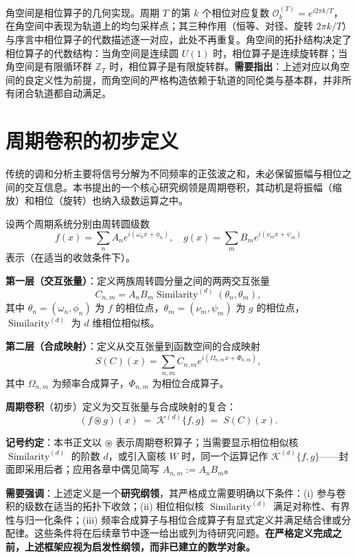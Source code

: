 角空间是相位算子的几何实现。周期 $T$ 的第 $k$ 个相位对应复数 $\mathcal{O}_k^{(T)} = e^{i2\pi k/T}$，在角空间中表现为轨道上的均匀采样点；其三种作用（恒等、对径、旋转 $2\pi k/T$）与序言中相位算子的代数描述逐一对应，此处不再重复。角空间的拓扑结构决定了相位算子的代数结构：当角空间是连续圆 $U(1)$ 时，相位算子是连续旋转群；当角空间是有限循环群 $\mathbb{Z}_T$ 时，相位算子是有限旋转群。\textbf{需要指出}：上述对应以角空间的良定义性为前提，而角空间的严格构造依赖于轨道的同伦类与基本群，并非所有闭合轨道都自动满足。

\section*{周期卷积的初步定义}

传统的调和分析主要将信号分解为不同频率的正弦波之和，未必保留振幅与相位之间的交互信息。本书提出的一个核心研究纲领是周期卷积，其动机是将振幅（缩放）和相位（旋转）也纳入级数运算之中。

\begin{definition}
设两个周期系统分别由周转圆级数
\[
f(x) = \sum_{n} A_n e^{i(\omega_n x + \phi_n)}, \quad g(x) = \sum_{m} B_m e^{i(\nu_m x + \psi_m)}
\]
表示（在适当的收敛条件下）。

\textbf{第一层（交互张量）}：定义两族周转圆分量之间的两两交互张量
\[
C_{n,m} = A_n B_m \operatorname{Similarity}^{(d)}(\theta_n, \theta_m),
\]
其中 $\theta_n = (\omega_n, \phi_n)$ 为 $f$ 的相位点，$\theta_m = (\nu_m, \psi_m)$ 为 $g$ 的相位点，$\operatorname{Similarity}^{(d)}$ 为 $d$ 维相位相似核。

\textbf{第二层（合成映射）}：定义从交互张量到函数空间的合成映射
\[
S(C)(x) = \sum_{n,m} C_{n,m} e^{i(\Omega_{n,m} x + \Phi_{n,m})},
\]
其中 $\Omega_{n,m}$ 为频率合成算子，$\Phi_{n,m}$ 为相位合成算子。

\textbf{周期卷积}（初步）定义为交互张量与合成映射的复合：
\[
(f \circledast g)(x) \;=\; \mathcal{K}^{(d)}\{f,g\} \;=\; S(C)(x).
\]
\end{definition}

\textbf{记号约定}：本书正文以 $\circledast$ 表示周期卷积算子；当需要显示相位相似核 $\operatorname{Similarity}^{(d)}$ 的阶数 $d$，或引入窗核 $W$ 时，同一个运算记作 $\mathcal{K}^{(d)}\{f,g\}$——封面即采用后者；应用各章中偶见简写 $A_{n,m} := A_n B_m$。

\textbf{需要强调}：上述定义是一个\textbf{研究纲领}，其严格成立需要明确以下条件：(i) 参与卷积的级数在适当的拓扑下收敛；(ii) 相位相似核 $\operatorname{Similarity}^{(d)}$ 满足对称性、有界性与归一化条件；(iii) 频率合成算子与相位合成算子有显式定义并满足结合律或分配律。这些条件将在后续章节中逐一给出或列为待研究问题。\textbf{在严格定义完成之前，上述框架应视为启发性纲领，而非已建立的数学对象。}

